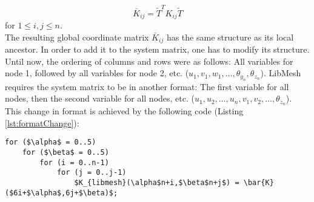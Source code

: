    \begin{equation*}
   \bar{K}_{ij} = \tilde{T}^T K_{ij} \tilde{T}
   \end{equation*}
   for $1 \leq i,j \leq n$.\\
   The resulting global coordinate matrix $\bar{K}_{ij}$ has the same structure as its local ancestor. In order to add it to the system matrix, one has to modify its structure. Until now, the ordering of columns and rows were as follows: All variables for node 1, followed by all variables for node 2, etc. ($u_1, v_1, w_1, \ldots, \theta_{y_n}, \theta_{z_n}$). LibMesh requires the system matrix to be in another format: The first variable for all nodes, then the second variable for all nodes, etc. ($u_1, u_2, \ldots, u_n, v_1, v_2, \ldots, \theta_{z_n}$). This change in format is achieved by the following code (Listing \ref{lst:formatChange}):
\begin{lstlisting}[caption=Bring stiffness matrix into libMesh conform format,label=lst:formatChange,mathescape,numbers=none]
for ($\alpha$ = 0..5)
	for ($\beta$ = 0..5)
		for (i = 0..n-1)
			for (j = 0..j-1)
				$K_{libmesh}(\alpha$n+i,$\beta$n+j$) = \bar{K}($6i+$\alpha$,6j+$\beta)$;
\end{lstlisting}

